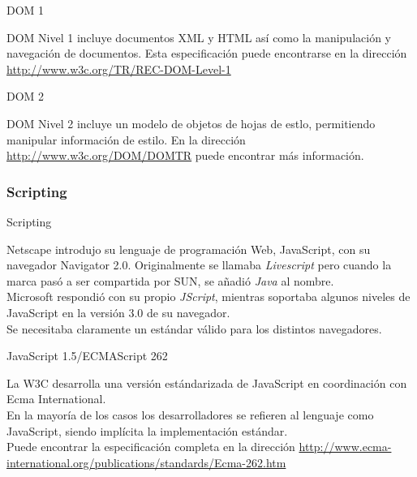 \documentclass{beamer}
\begin{document}
\begin{frame}{DOM 1} %
    \begin{center}
        DOM Nivel 1 incluye documentos XML y HTML así como la manipulación y
        navegación de documentos. Esta especificación puede encontrarse en la
        dirección \url{http://www.w3c.org/TR/REC-DOM-Level-1}
    \end{center}
\end{frame}

\begin{frame}{DOM 2} %
    \begin{center}
        DOM Nivel 2 incluye un modelo de objetos de hojas de estlo, permitiendo
        manipular información de estilo. En la dirección
        \url{http://www.w3c.org/DOM/DOMTR} puede encontrar más información.
    \end{center}
\end{frame}

\subsubsection{Scripting} 



\begin{frame}{Scripting} %
    \begin{center}
     Netscape introdujo su lenguaje de programación Web,  JavaScript, con su
     navegador Navigator 2.0. Originalmente se llamaba \textit{Livescript} pero
     cuando la marca pasó a ser compartida por SUN, se añadió \textit{Java} al nombre.\\[0.5cm]

     Microsoft respondió con su propio \textit{JScript}, mientras soportaba
     algunos niveles de JavaScript en la versión 3.0 de su navegador. \\[0.5cm]

     Se necesitaba claramente un estándar válido para los distintos
     navegadores.
    \end{center}
\end{frame}

\begin{frame}{JavaScript 1.5/ECMAScript 262} %
    \begin{center}
        La W3C desarrolla una versión estándarizada de JavaScript en
        coordinación con Ecma International.\\[0.5cm]

        En la mayoría de los casos los desarrolladores se refieren al lenguaje
        como JavaScript, siendo implícita la implementación estándar.\\[0.5cm]

        Puede encontrar la especificación completa en la dirección
        \url{http://www.ecma-international.org/publications/standards/Ecma-262.htm}
    \end{center}
\end{frame}
\end{document}
